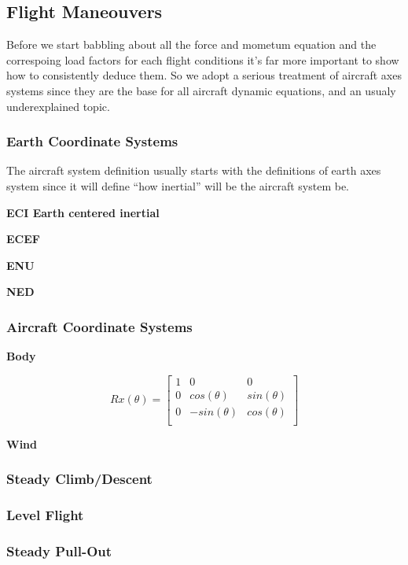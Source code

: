 \subsection{Flight Maneouvers}
Before we start babbling about all the force and mometum equation and the
correspoing load factors for each flight conditions it's far more important
to show how to consistently deduce them. So we adopt a serious treatment of aircraft axes systems since they are the base for
all aircraft dynamic equations, and an usualy underexplained topic.

\subsubsection{Earth Coordinate Systems}
The aircraft system definition usually starts with the definitions of earth axes
system since it will define ``how inertial'' will be the aircraft system be.

\bf{ECI}
Earth centered inertial

\bf{ECEF}

\bf{ENU}

\bf{NED}

\subsubsection{Aircraft Coordinate Systems}


\bf{Body}


\begin{equation}
    Rx(\theta) =
    \begin{bmatrix}
        1&   0&               0\\
        0&   cos(\theta)&     sin(\theta)\\
        0&   -sin(\theta)&    cos(\theta)\\
    \end{bmatrix}
\end{equation}


\bf{Wind}


\subsubsection{Steady Climb/Descent}

\subsubsection{Level Flight}

\subsubsection{Steady Pull-Out}

